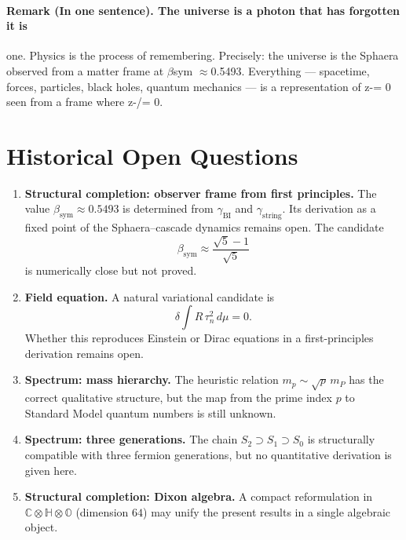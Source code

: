 \documentclass[12pt,a4paper]{article}
\begin{document}
\paragraph*{Remark (In one sentence). The universe is a photon that has forgotten it is}
one. Physics is the process of remembering. Precisely: the universe is the Sphaera observed from a matter frame at $\beta$sym $\approx$0.5493. Everything --- spacetime, forces, particles, black holes, quantum mechanics --- is a representation of z-= 0 seen from a frame where z-/= 0.

\section*{Historical Open Questions}
\begin{enumerate}
  \item \textbf{Structural completion: observer frame from first principles.} The value $\beta_{\mathrm{sym}} \approx 0.5493$ is determined from $\gamma_{\mathrm{BI}}$ and $\gamma_{\mathrm{string}}$. Its derivation as a fixed point of the Sphaera--cascade dynamics remains open. The candidate
  \[
  \beta_{\mathrm{sym}} \approx \frac{\sqrt{5}-1}{\sqrt{5}}
  \]
  is numerically close but not proved.

  \item \textbf{Field equation.} A natural variational candidate is
  \[
  \delta \int R \, \tau_n^2 \, d\mu = 0.
  \]
  Whether this reproduces Einstein or Dirac equations in a first-principles derivation remains open.

  \item \textbf{Spectrum: mass hierarchy.} The heuristic relation $m_p \sim \sqrt{p}\,m_P$ has the correct qualitative structure, but the map from the prime index $p$ to Standard Model quantum numbers is still unknown.

  \item \textbf{Spectrum: three generations.} The chain $S_2 \supset S_1 \supset S_0$ is structurally compatible with three fermion generations, but no quantitative derivation is given here.

  \item \textbf{Structural completion: Dixon algebra.} A compact reformulation in $\mathbb{C} \otimes \mathbb{H} \otimes \mathbb{O}$ (dimension $64$) may unify the present results in a single algebraic object.
\end{enumerate}

\clearpage
\end{document}
